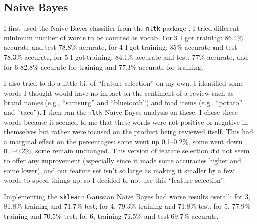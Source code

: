 \subsection{Naive Bayes}
I first used the Naive Bayes classifier from the \texttt{nltk} package \cite{bird2009}.  I tried different minimum number of words to be counted as vocab.  For 3 I got training: 86.4\% accurate and test 78.8\% accurate, for 4 I got training: 85\% accurate and test 78.3\% accurate, for 5 I got training: 84.1\% accurate and test: 77\% accurate, and for 6 82.8\% accurate for training and 77.3\% accurate for training.

I also tried to do a little bit of ``feature selection'' on my own.  I identified some words I thought would have no impact on the sentiment of a review such as brand names (e.g., ``samsung'' and ``bluetooth'') and food items (e.g., ``potato'' and ``taco'').  I then ran the \texttt{nltk} Naive Bayes analysis on these.  I chose these words because it seemed to me that these words were not positive or negative in themselves but rather were focused on the product being reviewed itself.  This had a marginal effect on the percentages: some went up 0.1--0.2\%, some went down 0.1--0.2\%, some remain unchanged.  This version of feature selection did not seem to offer any improvement (especially since it made some accuracies higher and some lower), and our feature set isn't so large as making it smaller by a few words to speed things up, so I decided to not use this ``feature selection''.

Implementing the \texttt{sklearn} \cite{zhu2009} Gaussian Naive Bayes had worse results overall: for 3, 81.8\% training and 71.7\% test; for 4, 79.3\% training and 71.8\% test; for 5, 77.9\% training and 70.5\% test; for 6, training 76.5\% and test 69.7\% accurate.